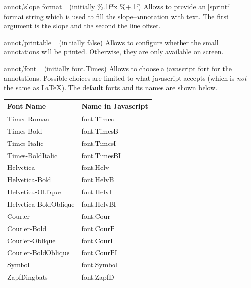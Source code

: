 \begin{pgfplotskey}{annot/slope format= (initially \%.1f*x \%+.1f)}
	Allows to provide an |sprintf| format string which is used to fill the slope--annotation with text.
	The first argument is the slope and the second the line offset.
\end{pgfplotskey}

\begin{pgfplotskey}{annot/printable= (initially false)}
	Allows to configure whether the small annotations will be printed. Otherwise, they are only available on screen.
\end{pgfplotskey}

\begin{pgfplotskey}{annot/font= (initially font.Times)}
	Allows to choose a javascript font for the annotations. Possible choices are limited to what javascript accepts (which is \emph{not} the same as \LaTeX). The default fonts and its names are shown below.

	\begin{center}
	\begin{tabular}{ll}
		\toprule
		Font Name	& Name in Javascript\\
		\midrule
		Times-Roman           & font.Times\\
        Times-Bold            & font.TimesB\\
        Times-Italic          & font.TimesI\\
        Times-BoldItalic      & font.TimesBI\\
        Helvetica             & font.Helv\\
        Helvetica-Bold        & font.HelvB\\
        Helvetica-Oblique     & font.HelvI\\
        Helvetica-BoldOblique & font.HelvBI\\
        Courier               & font.Cour\\
        Courier-Bold          & font.CourB\\
        Courier-Oblique       & font.CourI\\
        Courier-BoldOblique   & font.CourBI\\
        Symbol                & font.Symbol\\
        ZapfDingbats          & font.ZapfD\\
		\bottomrule
	\end{tabular}
	\end{center}
\end{pgfplotskey}

